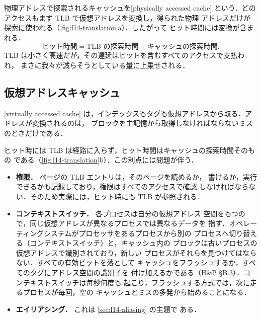 \documentclass[../main.tex]{subfiles}
\begin{document}
物理アドレスで探索されるキャッシュを[physically accessed cache]%
という．どのアクセスもまず TLB で仮想アドレスを変換し，得られた物理
アドレスだけが探索に使われる（\cref{fig:l14-translation}a）．したがって
ヒット時間には変換が含まれる．
\begin{equation}
  \text{ヒット時間} = \text{TLB の探索時間} + \text{キャッシュの探索時間} .
  \label{eq:l14-pa-hit}
\end{equation}
TLB は小さく高速だが，その遅延はヒットを含むすべてのアクセスで支払われ，
まさに我々が減らそうとしている量に上乗せされる．

\subsection{仮想アドレスキャッシュ}

\begin{definition}[仮想アドレスキャッシュ]
  [virtually accessed cache]%
  は，インデックスもタグも仮想アドレスから取る．アドレスが変換されるのは，
  ブロックを主記憶から取得しなければならないミスのときだけである．
\end{definition}

ヒット時には TLB は経路に入らず，ヒット時間はキャッシュの探索時間そのもの
である（\cref{fig:l14-translation}b）．この利点には問題が伴う．
\begin{itemize}
  \item \textbf{権限．} ページの TLB エントリは，そのページを読めるか，
    書けるか，実行できるかも記録しており，権限はすべてのアクセスで確認
    しなければならない．そのため実際には，ヒット時にも TLB が参照される．
  \item \textbf{コンテキストスイッチ．} 各プロセスは自分の仮想アドレス
    空間をもつので，同じ仮想アドレスが異なるプロセスでは異なるデータを
    指す．オペレーティングシステムがプロセッサをあるプロセスから別の
    プロセスへ切り替える（コンテキストスイッチ）と，キャッシュ内の
    ブロックは古いプロセスの仮想アドレスで識別されており，新しい
    プロセスがそれらを見つけてはならない．すべての有効ビットを落として
    キャッシュをフラッシュするか，すべてのタグにアドレス空間の識別子を
    付け加えるかである（H\&P §B.3）．コンテキストスイッチは毎秒何度も
    起こり，フラッシュする方式では，次に走るプロセスが毎回，空の
    キャッシュとミスの多発から始めることになる．
  \item \textbf{エイリアシング．} これは \cref{sec:l14-aliasing} の主題で
    ある．
\end{itemize}
\end{document}
